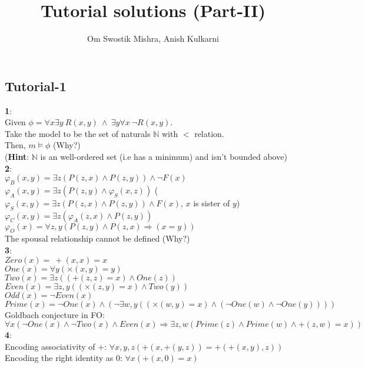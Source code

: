 \documentclass{article}
\title{\textbf{Tutorial solutions (Part-II)}}
\author{Om Swostik Mishra, Anish Kulkarni}
\date{}
\begin{document}
\maketitle
\tableofcontents
\clearpage
\begin{flushleft}
\section{Tutorial-1}
\textbf{1}:\\
Given $\phi= \forall x\exists y \:R(x,y)\: \wedge\: \exists y \forall x\:\neg R(x,y)$.\\
Take the model to be the set of naturals $\mathbb{N}$ with $<$ relation.\\
Then, $m\models \phi$ (Why?)\\
(\textbf{Hint}: $\mathbb{N}$ is an well-ordered set (i.e has a minimum) and isn't bounded above)\\
\textbf{2}:\\
$\varphi_B(x,y)=\exists z(P(z,x)\wedge P(z,y))\wedge \neg F(x)$\\
$\varphi_A(x,y)=\exists z(P(z,y)\wedge \varphi_S(x,z))$   \hspace{4.5mm} ($\varphi_S(x,y)=\exists z(P(z,x)\wedge P(z,y))\wedge F(x)$, $x$ is sister of $y$)\\
$\varphi_C(x,y)=\exists z(\varphi_A(z,x)\wedge P(z,y))$\\
$\varphi_O(x)=\forall z,y (P(z,y)\wedge P(z,x)\Rightarrow (x=y))$\\
The spousal relationship cannot be defined (Why?)\\
\textbf{3}:\\
$Zero(x)=\:+(x,x)=x$\\
$One(x)= \forall y(\times(x,y)=y)$\\
$Two(x)= \exists z((+(z,z)=x)\wedge One(z))$\\
$Even(x)= \exists z,y((\times(z,y)=x)\wedge Two(y))$ \\
$Odd(x)=\neg Even(x)$\\
$Prime(x)= \neg One(x)\wedge (\neg \exists w,y((\times(w,y)=x)\wedge(\neg One(w)\wedge \neg One(y))))$\\
Goldbach conjecture in FO: $\forall x(\neg One(x)\wedge \neg Two(x)\wedge Even(x)\Rightarrow \exists z,w(Prime(z)\wedge Prime(w)\wedge +(z,w)=x))$\\
\textbf{4}:\\
Encoding associativity of $+$:  $\forall x,y,z(+(x,+(y,z))=+(+(x,y),z))$\\
Encoding the right identity as $0$:  $\forall x(+(x,0)=x)$\\

\end{flushleft}
\end{document}

